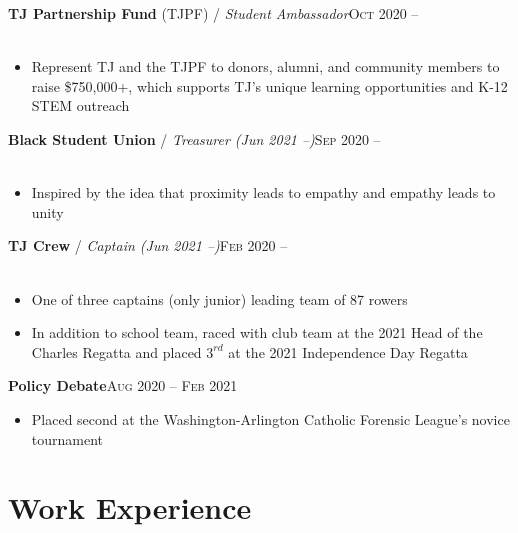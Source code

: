 \documentclass[12pt, a4paper]{article}
\begin{document}
\textbf{TJ Partnership Fund} (TJPF) / \textit{Student Ambassador}\hfill\textsc{Oct 2020 --}\\\
\begin{itemize}
    \vspace{-8mm}
    \item Represent TJ and the TJPF to donors, alumni, and community members to raise \$750,000+, which supports TJ's unique learning opportunities and K-12 STEM outreach
\end{itemize}

\textbf{Black Student Union} / \textit{Treasurer (Jun 2021 --)}\hfill\textsc{Sep 2020 --}\\\
\begin{itemize}
    \vspace{-8mm}
    \item Inspired by the idea that proximity leads to empathy and empathy leads to unity
\end{itemize}

\textbf{TJ Crew} / \textit{Captain (Jun 2021 --)}\hfill\textsc{Feb 2020 --}\\\
\begin{itemize}
    \vspace{-8mm}
    \item One of three captains (only junior) leading team of 87 rowers
    \item In addition to school team, raced with club team at the 2021 Head of the Charles Regatta and placed $3^{rd}$ at the 2021 Independence Day Regatta
\end{itemize}

\textbf{Policy Debate}\hfill\textsc{Aug 2020 -- Feb 2021}\\
\begin{itemize}
    \vspace{-8mm}
    \item Placed second at the Washington-Arlington Catholic Forensic League's novice tournament
\end{itemize}


\vspace{-8mm}
\section*{Work Experience}
\vspace{-2mm}
\end{document}

